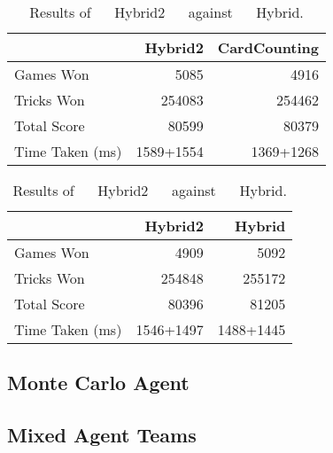\begin{table}[ht]
    \begin{minipage}{.525\linewidth}
        \centering
        \begin{tabular}{l|rr}
            ~               &  Hybrid2 &   CardCounting  \\  \hline
            Games Won       &   5085        &   4916   \\
            Tricks Won      &   254083      &   254462 \\
            Total Score     &   80599      &   80379  \\
            Time Taken (ms) &   1589+1554   &   1369+1268
        \end{tabular}
        \caption{Results of Hybrid2 against CardCounting.}
        \label{tab:hybrid2_cardcounting}
    \end{minipage}%
    \begin{minipage}{.525\linewidth}
        \centering
        \begin{tabular}{l|rr}
            ~               &  Hybrid2 &   Hybrid  \\  \hline
            Games Won       &   4909        &   5092   \\
            Tricks Won      &   254848      &   255172 \\
            Total Score     &   80396      &   81205  \\
            Time Taken (ms) &   1546+1497   &   1488+1445
        \end{tabular}
        \caption{Results of ~~ Hybrid2 ~~ against ~~ Hybrid.}
        \label{tab:hybrid2_hybrid}
    \end{minipage} 
\end{table}



\subsection{Monte Carlo Agent}



\subsection{Mixed Agent Teams}

